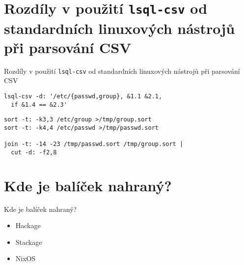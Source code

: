 \documentclass{beamer}
\def\icode#1{\texttt{#1}}
\begin{document}
\section{Rozdíly v použití \icode{lsql-csv} od standardních linuxových nástrojů při parsování CSV}
\begin{frame}[fragile]{Rozdíly v použití \icode{lsql-csv} od standardních linuxových nástrojů při parsování CSV}
\begin{verbatim}
lsql-csv -d: '/etc/{passwd,group}, &1.1 &2.1, 
  if &1.4 == &2.3'
\end{verbatim}


\vskip 1cm

\begin{verbatim}
sort -t: -k3,3 /etc/group >/tmp/group.sort
sort -t: -k4,4 /etc/passwd >/tmp/passwd.sort

join -t: -14 -23 /tmp/passwd.sort /tmp/group.sort |
  cut -d: -f2,8
\end{verbatim}
\end{frame}


\section{Kde je balíček nahraný?}
\begin{frame}[fragile]{Kde je balíček nahraný?}
\begin{itemize}
    \item Hackage
    \item Stackage
    \item NixOS
\end{itemize}
\end{frame}
\end{document}
